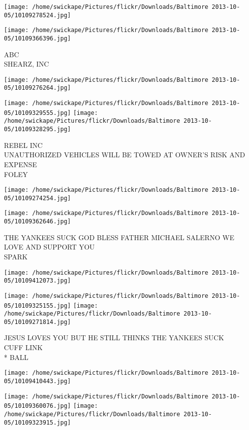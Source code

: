 \documentclass[10pt,letterpaper]{article}
\begin{document}
\texttt{[image: /home/swickape/Pictures/flickr/Downloads/Baltimore 2013-10-05/10109278524.jpg]}

\vspace{0.25in}
\texttt{[image: /home/swickape/Pictures/flickr/Downloads/Baltimore 2013-10-05/10109366396.jpg]}

ABC\\
SHEARZ, INC
\pagebreak

\texttt{[image: /home/swickape/Pictures/flickr/Downloads/Baltimore 2013-10-05/10109276264.jpg]}

\vspace{0.25in}
\texttt{[image: /home/swickape/Pictures/flickr/Downloads/Baltimore 2013-10-05/10109329555.jpg]}
\texttt{[image: /home/swickape/Pictures/flickr/Downloads/Baltimore 2013-10-05/10109328295.jpg]}

REBEL INC\\
UNAUTHORIZED VEHICLES WILL BE TOWED AT OWNER'S RISK AND EXPENSE\\
FOLEY
\pagebreak

\texttt{[image: /home/swickape/Pictures/flickr/Downloads/Baltimore 2013-10-05/10109274254.jpg]}

\vspace{0.25in}
\texttt{[image: /home/swickape/Pictures/flickr/Downloads/Baltimore 2013-10-05/10109362646.jpg]}

THE YANKEES SUCK GOD BLESS FATHER MICHAEL SALERNO WE LOVE AND SUPPORT YOU\\
SPARK
\pagebreak

\texttt{[image: /home/swickape/Pictures/flickr/Downloads/Baltimore 2013-10-05/10109412073.jpg]}

\vspace{0.25in}
\texttt{[image: /home/swickape/Pictures/flickr/Downloads/Baltimore 2013-10-05/10109325155.jpg]}
\texttt{[image: /home/swickape/Pictures/flickr/Downloads/Baltimore 2013-10-05/10109271814.jpg]}

JESUS LOVES YOU BUT HE STILL THINKS THE YANKEES SUCK\\
CUFF LINK\\
* BALL
\pagebreak

\texttt{[image: /home/swickape/Pictures/flickr/Downloads/Baltimore 2013-10-05/10109410443.jpg]}

\vspace{0.25in}
\texttt{[image: /home/swickape/Pictures/flickr/Downloads/Baltimore 2013-10-05/10109360076.jpg]}
\texttt{[image: /home/swickape/Pictures/flickr/Downloads/Baltimore 2013-10-05/10109323915.jpg]}
\end{document}
